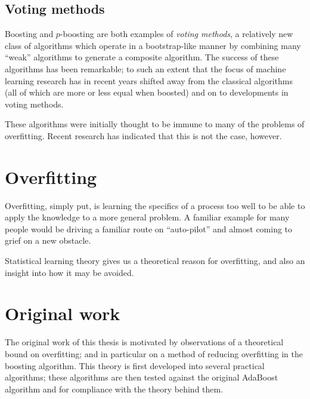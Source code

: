 \subsection{Voting methods}

Boosting and $p$-boosting are both examples of \emph{voting methods},
a relatively new class of algorithms which operate in a bootstrap-like
manner by combining many ``weak'' algorithms to generate a composite
algorithm.  The success of these algorithms has been remarkable; to
such an extent that the focus of machine learning research has in
recent years shifted away from the classical algorithms (all of which
are more or less equal when boosted) and on to developments in voting
methods.

These algorithms were initially thought to be immune to many of the
problems of overfitting.  Recent research has indicated that this is
not the case, however.

\section{Overfitting}

Overfitting, simply put, is learning the specifics of a process too
well to be able to apply the knowledge to a more general problem.
A familiar example for many people would be driving a familiar route
on ``auto-pilot'' and almost coming to grief on a new obstacle.

Statistical learning theory gives us a theoretical reason for
overfitting, and also an insight into how it may be avoided.  


\section{Original work}

The original work of this thesis is motivated by observations of a
theoretical bound on overfitting; and in particular on a method of
reducing overfitting in the boosting algorithm.  This theory is first
developed into several practical algorithms; these algorithms are then
tested against the original AdaBoost algorithm and for compliance with
the theory behind them.



